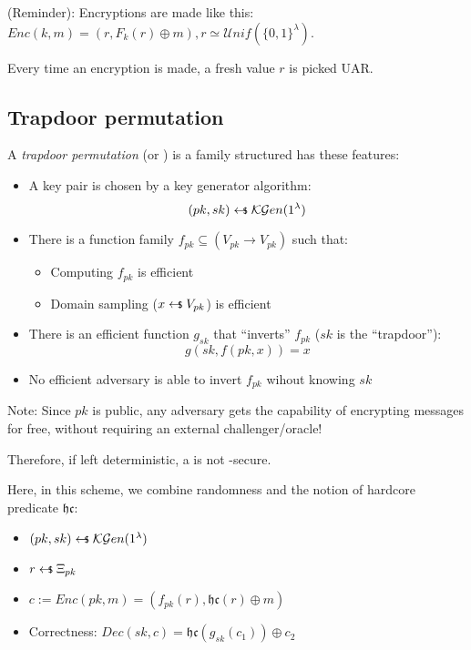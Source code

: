 (Reminder): Encryptions are made like this: $Enc(k, m) = (r, F_k(r) \oplus m), r \simeq \mathcal{U}nif(\{0, 1\}^\lambda)$.

Every time an encryption is made, a fresh value $r$ is picked UAR.

\pagebreak
\subsection{Trapdoor permutation}

A \emph{trapdoor permutation} (or \tdp) is a \owp{} family structured has these features:

\begin{itemize}
    \item A key pair is chosen \uar{} by a key generator algorithm:
    \[
        (pk, sk) \pickUAR \mathcal{KG}en(1^\lambda)
    \]
    \item There is a function family $f_{pk} \subseteq (V_{pk} \to V_{pk})$ such that:
    \begin{itemize}
        \item Computing $f_{pk}$ is efficient
        \item Domain sampling ($x \pickUAR V_{pk}$) is efficient
    \end{itemize}
    \item There is an efficient function $g_{sk}$ that ``inverts'' $f_{pk}$ ($sk$ is the ``trapdoor''): 
    \begin{equation*}
        g(sk, f(pk, x)) = x
    \end{equation*}
    \item No efficient adversary is able to invert $f_{pk}$ wihout knowing $sk$
\end{itemize}

Note: Since $pk$ is public, any adversary gets the capability of encrypting messages for free, without requiring an external challenger/oracle!

Therefore, if left deterministic, a \tdp{} is not \cpa-secure.

Here, in this scheme, we combine randomness and the notion of hardcore predicate $\mathfrak{hc}$:

\begin{itemize}
    \item $(pk, sk) \pickUAR \mathcal{KG}en(1^\lambda)$
    \item $r \pickUAR \Xi_{pk}$
    \item $c := Enc(pk, m) = (f_{pk}(r), \mathfrak{hc}(r) \oplus m)$
    \item Correctness: $Dec(sk, c) = \mathfrak{hc}(g_{sk}(c_1)) \oplus c_2$
\end{itemize}

